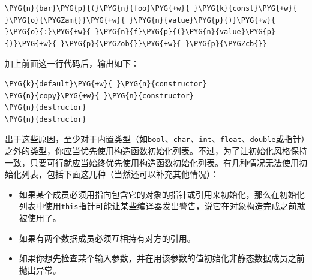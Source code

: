 
\begin{codeblockbg}
\begin{Verbatim}[commandchars=\\\{\},breaklines=true,breakanywhere=true,fontsize=\codefont,xleftmargin=17bp]
\PYG{n}{bar}\PYG{p}{(}\PYG{n}{foo}\PYG{+w}{ }\PYG{k}{const}\PYG{+w}{ }\PYG{o}{\PYGZam{}}\PYG{+w}{ }\PYG{n}{value}\PYG{p}{)}\PYG{+w}{ }\PYG{o}{:}\PYG{+w}{ }\PYG{n}{f}\PYG{p}{(}\PYG{n}{value}\PYG{p}{)}\PYG{+w}{ }\PYG{p}{\PYGZob{}}\PYG{+w}{ }\PYG{p}{\PYGZcb{}}
\end{Verbatim}
\end{codeblockbg}



加上前面这一行代码后，输出如下：



\begin{codeblockbg}
\begin{Verbatim}[commandchars=\\\{\},breaklines=true,breakanywhere=true,fontsize=\codefont,xleftmargin=17bp]
\PYG{k}{default}\PYG{+w}{ }\PYG{n}{constructor}
\PYG{n}{copy}\PYG{+w}{ }\PYG{n}{constructor}
\PYG{n}{destructor}
\PYG{n}{destructor}
\end{Verbatim}
\end{codeblockbg}



出于这些原因，至少对于内置类型（如\texttt{bool}、\texttt{char}、\texttt{int}、\texttt{float}、\texttt{double}或指针）之外的类型，你应当优先使用构造函数初始化列表。不过，为了让初始化风格保持一致，只要可行就应当始终优先使用构造函数初始化列表。有几种情况无法使用初始化列表，包括下面这几种（当然还可以补充其他情况）：



\begin{itemize}
\item 如果某个成员必须用指向包含它的对象的指针或引用来初始化，那么在初始化列表中使用\texttt{this}指针可能让某些编译器发出警告，说它在对象构造完成之前就被使用了。



\item 如果有两个数据成员必须互相持有对方的引用。



\item 如果你想先检查某个输入参数，并在用该参数的值初始化非静态数据成员之前抛出异常。

\end{itemize}


